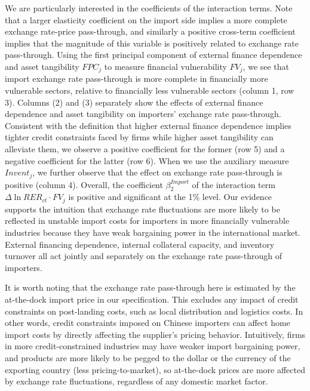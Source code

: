 We are particularly interested in the coefficients of the interaction terms. Note that a larger elasticity coefficient on the import side implies a more complete exchange rate-price pass-through, and similarly a positive cross-term coefficient implies that the magnitude of this variable is positively related to exchange rate pass-through. Using the first principal component of external finance dependence and asset tangibility $FPC_j$ to measure financial vulnerability $FV_j$, we see that import exchange rate pass-through is more complete in financially more vulnerable sectors, relative to financially less vulnerable sectors (column 1, row 3). Columns (2) and (3) separately show the effects of external finance dependence and asset tangibility on importers' exchange rate pass-through. Consistent with the definition that higher external finance dependence implies tighter credit constraints faced by firms while higher asset tangibility can alleviate them, we observe a positive coefficient for the former (row 5) and a negative coefficient for the latter (row 6). When we use the auxiliary measure $Invent_j$, we further observe that the effect on exchange rate pass-through is positive (column 4). Overall, the coefficient $\beta^{Import}_2$ of the interaction term $\Delta \ln RER_{ct} \cdot FV_{j}$ is positive and significant at the 1\% level. Our evidence supports the intuition that exchange rate fluctuations are more likely to be reflected in unstable import costs for importers in more financially vulnerable industries because they have weak bargaining power in the international market. External financing dependence, internal collateral capacity, and inventory turnover all act jointly and separately on the exchange rate pass-through of importers.

It is worth noting that the exchange rate pass-through here is estimated by the at-the-dock import price in our specification. This excludes any impact of credit constraints on post-landing costs, such as local distribution and logistics costs. In other words, credit constraints imposed on Chinese importers can affect home import costs by directly affecting the supplier's pricing behavior. Intuitively, firms in more credit-constrained industries may have weaker import bargaining power, and products are more likely to be pegged to the dollar or the currency of the exporting country (less pricing-to-market), so at-the-dock prices are more affected by exchange rate fluctuations, regardless of any domestic market factor.

